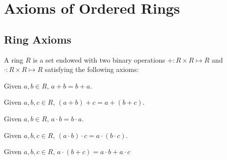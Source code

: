 %

\section{Axioms of Ordered Rings}

\subsection{Ring Axioms}

\begin{definition}[Ring]\label{ring}
    A ring $R$ is a set endowed with two binary operations $+ : R \times R \mapsto R$ and $\cdot : R \times R \mapsto R$ satisfying the following axioms:
\end{definition}

\begin{axiom}[Commutativity of $+$]\label{commu-add}
    Given $a, b \in R$, $a+b = b+a$.
\end{axiom}

\begin{axiom}[Associativity of $+$]\label{assoc-add}
    Given $a, b, c \in R$, $(a+b)+c = a+(b+c)$.
\end{axiom}

\begin{axiom}\label{commu-mult}
    Given $a, b \in R$, $a \cdot b = b \cdot a$.
\end{axiom}

\begin{axiom}\label{assoc-mult}
    Given $a, b, c \in R$, $(a \cdot b)\cdot c = a \cdot (b \cdot c)$.
\end{axiom}

\begin{axiom}\label{dist-mult-over-add}
    Given $a, b , c \in R$, $a \cdot (b+c) = a \cdot b + a \cdot c$
\end{axiom}

